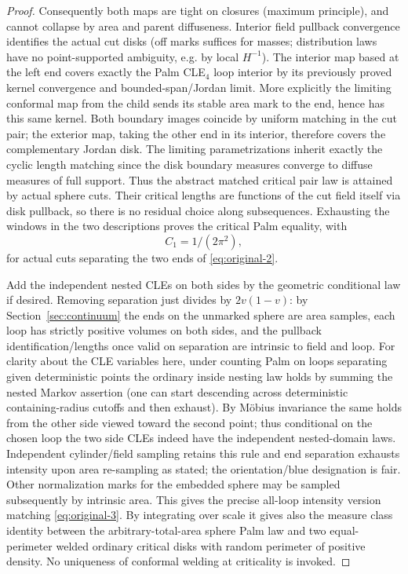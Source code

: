 \begin{proof}
Consequently both maps are tight on closures (maximum principle), and cannot collapse by area and parent diffuseness.
Interior field pullback convergence identifies the actual cut disks (off marks suffices for masses; distribution laws have no point-supported ambiguity, e.g. by local \(H^{-1}\)).
The interior map based at the left end covers exactly the Palm CLE\(_4\) loop interior by its previously proved kernel convergence and bounded-span/Jordan limit.
More explicitly the limiting conformal map from the child sends its stable area mark to the end, hence has this same kernel.
Both boundary images coincide by uniform matching in the cut pair; the exterior map, taking the other end in its interior, therefore covers the complementary Jordan disk.
The limiting parametrizations inherit exactly the cyclic length matching since the disk boundary measures converge to diffuse measures of full support.
Thus the abstract matched critical pair law is attained by actual sphere cuts.
Their critical lengths are functions of the cut field itself via disk pullback, so there is no residual choice along subsequences.
Exhausting the windows in the two descriptions proves the critical Palm equality, with
\[
 C_1=1/(2\pi^2),
\]
for actual cuts separating the two ends of \eqref{eq:original-2}.

Add the independent nested CLEs on both sides by the geometric conditional law if desired.
Removing separation just divides by \(2v(1-v)\): by Section~\ref{sec:continuum} the ends on the unmarked sphere are area samples, each loop has strictly positive volumes on both sides, and the pullback identification/lengths once valid on separation are intrinsic to field and loop.
For clarity about the CLE variables here, under counting Palm on loops separating given deterministic points the ordinary inside nesting law holds by summing the nested Markov assertion (one can start descending across deterministic containing-radius cutoffs and then exhaust).
By Möbius invariance the same holds from the other side viewed toward the second point; thus conditional on the chosen loop the two side CLEs indeed have the independent nested-domain laws.
Independent cylinder/field sampling retains this rule and end separation exhausts intensity upon area re-sampling as stated; the orientation/blue designation is fair.
Other normalization marks for the embedded sphere may be sampled subsequently by intrinsic area.
This gives the precise all-loop intensity version matching \eqref{eq:original-3}.
By integrating over scale it gives also the measure class identity between the arbitrary-total-area sphere Palm law and two equal-perimeter welded ordinary critical disks with random perimeter of positive density.
No uniqueness of conformal welding at criticality is invoked.

\end{proof}


